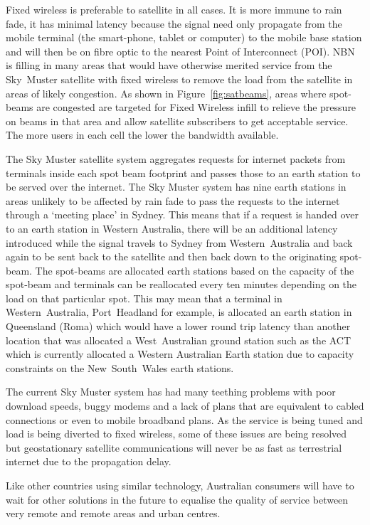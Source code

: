 Fixed wireless is preferable to satellite in all cases. It is more immune to rain fade, it has minimal latency because the signal need only propagate from the mobile terminal (the smart-phone, tablet or computer) to the mobile base station and will then be on fibre optic to the nearest Point of Interconnect (POI). NBN is filling in many areas that would have otherwise merited service from the Sky~Muster satellite with fixed wireless to remove the load from the satellite in areas of likely congestion. As shown in Figure~\ref{fig:satbeams}, areas where spot-beams are congested are targeted for Fixed Wireless infill to relieve the pressure on beams in that area and allow satellite subscribers to get acceptable service. The more users in each cell the lower the bandwidth available. 

The Sky Muster satellite system aggregates requests for internet packets from terminals inside each spot beam footprint and passes those to an earth station to be served over the internet. The Sky Muster system has nine earth stations in areas unlikely to be affected by rain fade to pass the requests to  the internet through a `meeting place' in Sydney. This means that if a request is handed over to an earth station in Western Australia, there will be an additional latency introduced while the signal travels to Sydney from Western~Australia and back again to be sent back to the satellite and then back down to the originating spot-beam. The spot-beams are allocated earth stations based on the capacity of the spot-beam and terminals can be reallocated every ten minutes depending on the load on that particular spot. This may mean that a terminal in Western~Australia, Port~Headland for example, is allocated an earth station in Queensland (Roma) which would have a lower round trip latency than another location that was allocated a West~Australian ground station such as the ACT which is currently allocated a Western Australian Earth station due to capacity constraints on the New~South~Wales earth stations.\cite{RefWorks:340}

The current Sky Muster system has had many teething problems with poor download speeds, buggy modems and a lack of plans that are equivalent to cabled connections or even to mobile broadband plans. As the service is being tuned and load is being diverted to fixed wireless, some of these issues are being resolved but geostationary satellite communications will never be as fast as terrestrial internet due to the propagation delay.

Like other countries using similar technology, Australian consumers will have to wait for other solutions in the future to equalise the quality of service between very remote and remote areas and urban centres.


